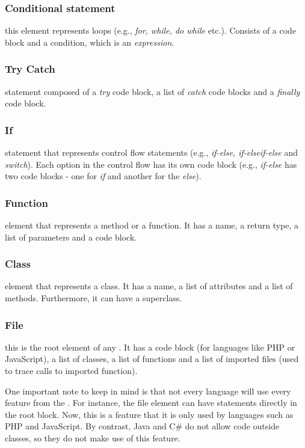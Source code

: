 \subsubsection{Conditional statement} this element represents loops (e.g., \textit{for, while, do while} etc.). Consists of a code block and a condition, which is an \textit{expression}.

\subsubsection{Try Catch} statement composed of a \textit{try} code block, a list of \textit{catch} code blocks and a \textit{finally} code block. 


\subsubsection{If} statement that represents control flow statements (e.g., \textit{if-else, if-elseif-else} and \textit{switch}). Each option in the control flow has its own code block (e.g., \textit{if-else} has two code blocks - one for \textit{if} and another for the \textit{else}).

\subsubsection{Function} element that represents a method or a function. It has a name, a return type, a list of parameters and a code block.

\subsubsection{Class} element that represents a class. It has a name, a list of attributes and a list of methods. Furthermore, it can have a superclass.

\subsubsection{File} this is the root element of any \astname{}. It has a code block (for languages like PHP or JavaScript), a list of classes, a list of functions and a list of imported files (used to trace calls to imported function).




One important note to keep in mind is that not every language will use every feature from the \astname{}. For instance, the file element can have statements directly in the root block. Now, this is a feature that it is only used by languages such as PHP and JavaScript. By contrast, Java and C\# do not allow code outside classes, so they do not make use of this feature. 

